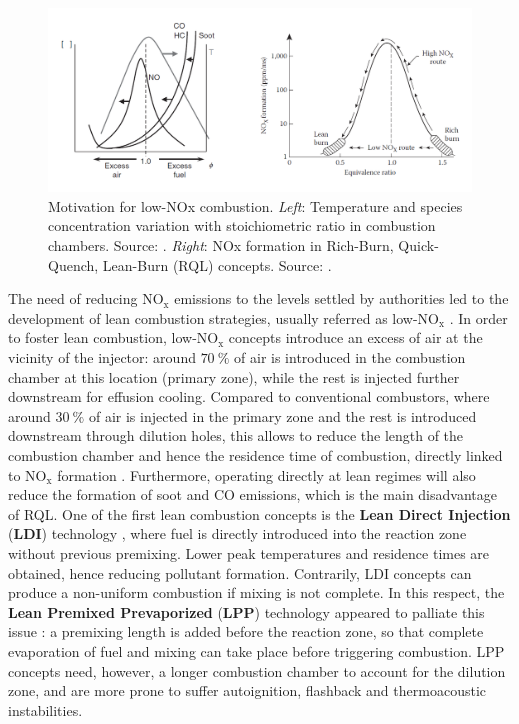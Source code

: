 \begin{figure}[h!]
	\centering
	\includegraphics[scale=0.65]{./part0_intro/NOX_motivation_and_RQL}
	\caption[Motivation for low-NOx combustion]{Motivation for low-NOx combustion. \textsl{Left}: Temperature and species concentration variation with stoichiometric ratio in combustion chambers. Source: . \textsl{Right}: NOx formation in Rich-Burn, Quick-Quench, Lean-Burn (RQL) concepts. Source: .}
	\label{fig:NOX_motivation_and_RQL}
\end{figure}

The need of reducing NO$_\mathrm{x}$ emissions to the levels settled by authorities led to the development of lean combustion strategies, usually referred as low-NO$_\mathrm{x}$ . In order to foster lean combustion, low-NO$_\mathrm{x}$ concepts introduce an excess of air at the vicinity of the injector: around $70 ~\%$ of air is introduced in the combustion chamber at this location (primary zone), while the rest is injected further downstream for effusion cooling. Compared to conventional combustors, where around $30 ~\%$ of air is injected in the primary zone and the rest is introduced downstream through dilution holes, this allows to reduce the length of the combustion chamber and hence the residence time of combustion, directly linked to NO$_\mathrm{x}$ formation . Furthermore, operating directly at lean regimes will also reduce the formation of soot and CO emissions, which is the main disadvantage of RQL. One of the first lean combustion concepts is the \textbf{Lean Direct Injection} (\textbf{LDI}) technology , where fuel is directly introduced into the reaction zone without previous premixing. Lower peak temperatures and residence times are obtained, hence reducing pollutant formation. Contrarily, LDI concepts can produce a non-uniform combustion if mixing is not complete. In this respect, the \textbf{Lean Premixed Prevaporized} (\textbf{LPP}) technology appeared to palliate this issue : a premixing length is added before the reaction zone, so that complete evaporation of fuel and mixing can take place before triggering combustion. LPP concepts need, however, a longer combustion chamber to account for the dilution zone, and are more prone to suffer autoignition, flashback and thermoacoustic instabilities.

